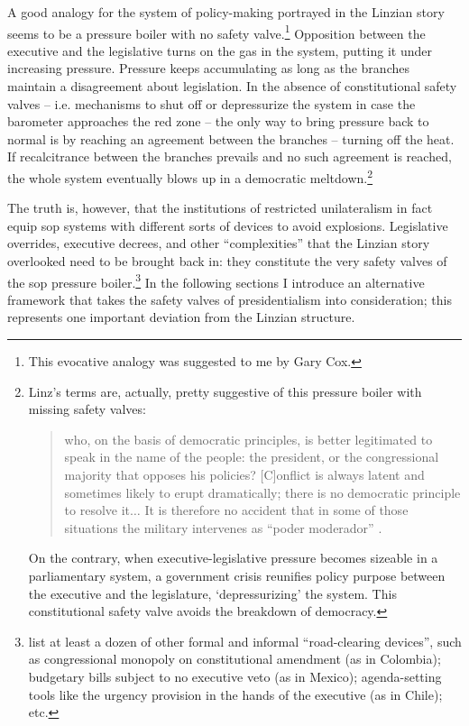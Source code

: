 A good analogy for the system of policy-making portrayed in the Linzian story seems to be a pressure boiler with no safety valve.\footnote{This evocative analogy was suggested to me by Gary Cox.}  Opposition between the executive and the legislative turns on the gas in the system, putting it under increasing pressure.  Pressure keeps accumulating as long as the branches maintain a disagreement about legislation.  In the absence of constitutional safety valves – i.e. mechanisms to shut off or depressurize the system in case the barometer approaches the red zone – the only way to bring pressure back to normal is by reaching an agreement between the branches – turning off the heat.  If recalcitrance between the branches prevails and no such agreement is reached, the whole system eventually blows up in a democratic meltdown.\footnote{Linz’s terms are, actually, pretty suggestive of this pressure boiler with missing safety valves: \begin{quote}who, on the basis of democratic principles, is better legitimated to speak in the name of the people: the president, or the congressional majority that opposes his policies?  [C]onflict is always latent and sometimes likely to erupt dramatically; there is no democratic principle to resolve it$\ldots$  It is therefore no accident that in some of those situations the military intervenes as “poder moderador” \citeyearpar[][7]{linz.1994}.\end{quote} On the contrary, when executive-legislative pressure becomes sizeable in a parliamentary system, a government crisis reunifies policy purpose between the executive and the legislature, ‘depressurizing’ the system.  This constitutional safety valve avoids the breakdown of democracy.}

The truth is, however, that the institutions of restricted unilateralism in fact equip sop systems with different sorts of devices to avoid explosions.  Legislative overrides, executive decrees, and other “complexities” that the Linzian story overlooked need to be brought back in: they constitute the very safety valves of the sop pressure boiler.\footnote{\citet{domingo.morgenstern.nd} list at least a dozen of other formal and informal “road-clearing devices”, such as congressional monopoly on constitutional amendment (as in Colombia); budgetary bills subject to no executive veto (as in Mexico); agenda-setting tools like the urgency provision in the hands of the executive (as in Chile); etc.}  In the following sections I introduce an alternative framework that takes the safety valves of presidentialism into consideration; this represents one important deviation from the Linzian structure.  

